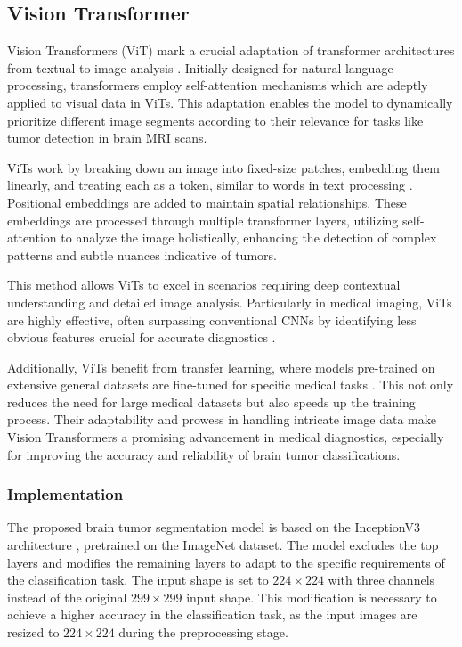 \subsection{Vision Transformer}\label{vit}

Vision Transformers (ViT) mark a crucial adaptation of transformer architectures from textual to image analysis \cite{Khan2021Transformers}. Initially designed for natural language processing, transformers employ self-attention mechanisms which are adeptly applied to visual data in ViTs. This adaptation enables the model to dynamically prioritize different image segments according to their relevance for tasks like tumor detection in brain MRI scans.

ViTs work by breaking down an image into fixed-size patches, embedding them linearly, and treating each as a token, similar to words in text processing \cite{Wu2020Visual}. Positional embeddings are added to maintain spatial relationships. These embeddings are processed through multiple transformer layers, utilizing self-attention to analyze the image holistically, enhancing the detection of complex patterns and subtle nuances indicative of tumors.

This method allows ViTs to excel in scenarios requiring deep contextual understanding and detailed image analysis. Particularly in medical imaging, ViTs are highly effective, often surpassing conventional CNNs by identifying less obvious features crucial for accurate diagnostics \cite{Matsoukas2021Is}.

Additionally, ViTs benefit from transfer learning, where models pre-trained on extensive general datasets are fine-tuned for specific medical tasks \cite{Simon2022Vision}. This not only reduces the need for large medical datasets but also speeds up the training process. Their adaptability and prowess in handling intricate image data make Vision Transformers a promising advancement in medical diagnostics, especially for improving the accuracy and reliability of brain tumor classifications.


\subsubsection{Implementation}


The proposed brain tumor segmentation model is based on the InceptionV3 architecture \cite{szegedy_rethinking_2015}, pretrained on the ImageNet dataset. The model excludes the top layers and modifies the remaining layers to adapt to the specific requirements of the classification task. The input shape is set to $224\times224$ with three channels instead of the original $299\times299$ input shape. This modification is necessary to achieve a higher accuracy in the classification task, as the input images are resized to $224\times224$ during the preprocessing stage.

